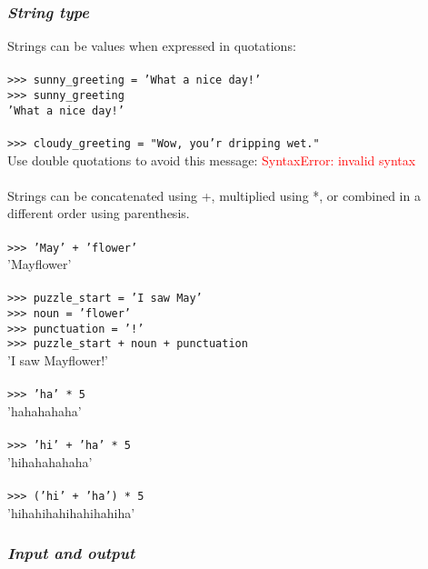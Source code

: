\documentclass{article}
\begin{document}
{{{\subsubsection{\small\textsl{String type}}
Strings can be values when expressed in quotations:\\
\\
\texttt{>>> sunny\_greeting = 'What a nice day!'}\\
\texttt{>>> sunny\_greeting}\\
\texttt{'What a nice day!'}\\
\\
\texttt{>>> cloudy\_greeting = "Wow, you'r dripping wet."}\\
Use double quotations to avoid this message:
\textcolor{red}{SyntaxError: invalid syntax}\\
\\
Strings can be concatenated using +, multiplied using *, or combined in a different order using parenthesis.\\
\\
\texttt{>>> 'May' + 'flower'}\\
'Mayflower'\\
\\
\texttt{>>> puzzle\_start = 'I saw May'}\\
\texttt{>>> noun = 'flower'}\\
\texttt{>>> punctuation = '!'}\\
\texttt{>>> puzzle\_start + noun + punctuation}\\
'I saw Mayflower!' \\
\\
\texttt{>>> 'ha' * 5}\\
'hahahahaha'\\
\\
\texttt{>>> 'hi' + 'ha' * 5}\\
'hihahahahaha'\\
\\
\texttt{>>> ('hi' + 'ha') * 5}\\
'hihahihahihahihahiha'

\subsubsection{\small\textsl{Input and output}}
}}}
\end{document}
